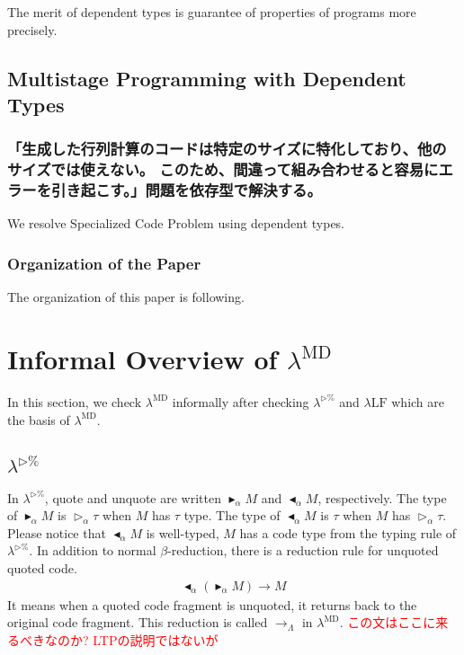 \documentclass[runningheads]{llncs}
\newcommand{\red}[1]{\textcolor{red}{#1 }}
\newcommand{\LTP}{$\lambda^{\triangleright\%}$\xspace}
\newcommand{\LMD}{$\lambda^{\textrm{MD}}$\xspace}
\newcommand{\LLF}{$\lambda\textrm{LF}$\xspace}
\newcommand{\TW}{\triangleright}
\newcommand{\TB}{\blacktriangleright}
\newcommand{\TBL}{\blacktriangleleft}
\begin{document}
The merit of dependent types is guarantee of properties of programs more precisely.

\subsection{Multistage Programming with Dependent Types}

\subsubsection{「生成した行列計算のコードは特定のサイズに特化しており、他のサイズでは使えない。
このため、間違って組み合わせると容易にエラーを引き起こす。」問題を依存型で解決する。}

We resolve Specialized Code Problem using dependent types.

\subsubsection{Organization of the Paper}

The organization of this paper is following.

\section{Informal Overview of \LMD}

In this section, we check \LMD informally after checking \LTP and \LLF which are the basis of \LMD.

\subsection{\LTP}


In \LTP, quote and unquote are written $\TB_\alpha M$ and $\TBL_\alpha M$, respectively.
The type of $\TB_\alpha M$ is $\TW_\alpha \tau$ when $M$ has $\tau$ type.
The type of $\TBL_\alpha M$ is $\tau$ when $M$ has $\TW_\alpha \tau$.
Please notice that $\TBL_\alpha M$ is well-typed, $M$ has a code type from the typing rule of \LTP.
In addition to normal $\beta$-reduction, there is a reduction rule for unquoted quoted code.
\begin{align*}
    \TBL_\alpha (\TB_\alpha M) \longrightarrow M
\end{align*}
It means when a quoted code fragment is unquoted, it returns back to the original code fragment.
This reduction is called $\longrightarrow_\Lambda$ in \LMD.
\red{この文はここに来るべきなのか? LTPの説明ではないが}
\end{document}
